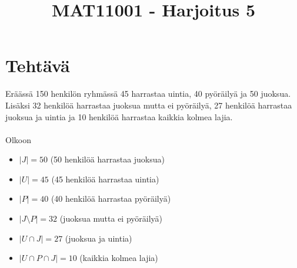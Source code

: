 \documentclass{article}
\newcounter{tehtava}
\begin{document}
    \thispagestyle{plain}
	\title{MAT11001 - Harjoitus 5}
	\date{}
	\maketitle
	
	
	\section*{Tehtävä \thetehtava}
    Eräässä 150 henkilön ryhmässä 45 harrastaa uintia, 40 pyöräilyä ja 50 juoksua. Lisäksi 32
henkilöä harrastaa juoksua mutta ei pyöräilyä, 27 henkilöä harrastaa juoksua ja uintia ja 10
henkilöä harrastaa kaikkia kolmea lajia.

\paragraph*{}
Olkoon
\begin{itemize}
    \item $|J| = 50$ (50 henkilöä harrastaa juoksua)
    \item $|U| = 45$ (45 henkilöä harrastaa uintia)
    \item $|P| = 40$ (40 henkilöä harrastaa pyöräilyä)
    \item $|J \setminus P| = 32$  (juoksua mutta ei pyöräilyä)
    \item $|U \cap J| = 27$ (juoksua ja uintia)
    \item $|U \cap P \cap J| = 10$ (kaikkia kolmea lajia)
\end{itemize}



\paragraph*{}
\end{document}
